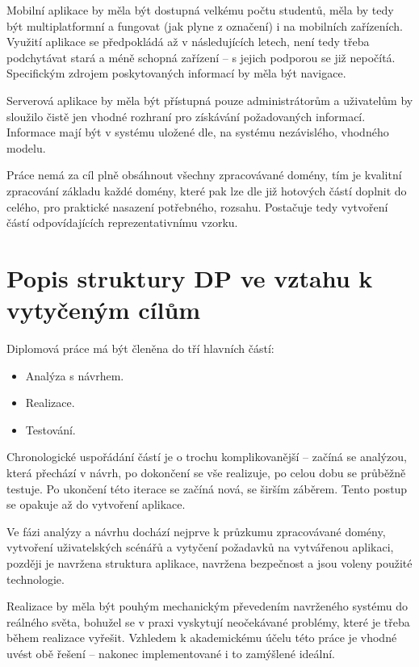 Mobilní aplikace by měla být dostupná velkému počtu studentů, měla by tedy být multiplatformní a fungovat (jak plyne z označení) i na mobilních zařízeních. Využití aplikace se předpokládá až v následujících letech, není tedy třeba podchytávat stará a méně schopná zařízení -- s jejich podporou se již nepočítá. Specifickým zdrojem poskytovaných informací by měla být navigace.

Serverová aplikace by měla být přístupná pouze administrátorům a uživatelům by sloužilo čistě jen vhodné rozhraní pro získávání požadovaných informací. Informace mají být v systému uložené dle, na systému nezávislého, vhodného modelu.

Práce nemá za cíl plně obsáhnout všechny zpracovávané domény, tím je kvalitní zpracování základu každé domény, které pak lze dle již hotových částí doplnit do celého, pro praktické nasazení potřebného, rozsahu. Postačuje tedy vytvoření částí odpovídajících reprezentativnímu vzorku.


\section{Popis struktury DP ve vztahu k vytyčeným cílům}
Diplomová práce má být členěna do tří hlavních částí:
\begin{itemize}
 \item Analýza s návrhem.
 \item Realizace.
 \item Testování.
\end{itemize}
Chronologické uspořádání částí je o trochu komplikovanější -- začíná se analýzou, která přechází v návrh, po dokončení se vše realizuje, po celou dobu se průběžně testuje. Po ukončení této iterace se začíná nová, se širším záběrem. Tento postup se opakuje až do vytvoření aplikace.

Ve fázi analýzy a návrhu dochází nejprve k průzkumu zpracovávané domény, vytvoření uživatelských scénářů a vytyčení požadavků na vytvářenou aplikaci, později je navržena struktura aplikace, navržena bezpečnost a jsou voleny použité technologie.

Realizace by měla být pouhým mechanickým převedením navrženého systému do reálného světa, bohužel se v praxi vyskytují neočekávané problémy, které je třeba během realizace vyřešit. Vzhledem k akademickému účelu této práce je vhodné uvést obě řešení -- nakonec implementované i to zamýšlené ideální.

